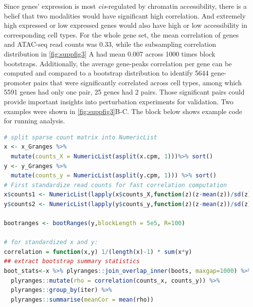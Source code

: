 \documentclass{article}
\begin{document}
Since genes' expression is most \textit{cis}-regulated by chromatin accessibility, there is a belief that two modalities would have significant high correlation. And extremely high expressed or low expressed genes would also have high or low accessibility in corresponding cell types. For the whole gene set, the mean correlation of genes and ATAC-seq read counts was 0.33, while the subsampling correlation distribution in \cref{fig:suppfig3} A had mean 0.007 across 1000 times block bootstraps. Additionally, the average gene-peaks correlation per gene can be
computed and compared to a bootstrap distribution to
identify 5644 gene-promoter pairs that were significantly correlated across cell types, among which 5591 genes had only
one pair, 25 genes had 2 pairs. 
Those significant pairs could provide important insights into perturbation experiments for validation. Two examples were shown in \cref{fig:suppfig3}B-C. The block below shows example code for running analysis.
\begin{lstlisting}[language=R]
# split sparse count matrix into NumericList
x <- x_Granges %>%
  mutate(counts_X = NumericList(asplit(x.cpm, 1)))%>% sort()
y <- y_Granges %>%
  mutate(counts_y = NumericList(asplit(y.cpm, 1))) %>% sort()
# First standardize read counts for fast correlation computation
x$counts1 <- NumericList(lapply(x$counts_X,function(z)(z-mean(z))/sd(z)))
y$counts2 <- NumericList(lapply(y$counts_y,function(z)(z-mean(z))/sd(z)))

bootranges <- bootRanges(y,blockLength = 5e5, R=100)
  
# for standardized x and y:
correlation = function(x,y) 1/(length(x)-1) * sum(x*y)
## extract bootstrap summary statistics
boot_stats<-x %>% plyranges::join_overlap_inner(boots, maxgap=1000) %>%
  plyranges::mutate(rho = correlation(counts_x, counts_y)) %>%
  plyranges::group_by(iter) %>%
  plyranges::summarise(meanCor = mean(rho)) 
\end{lstlisting} 
 
\newpage
\end{document}
